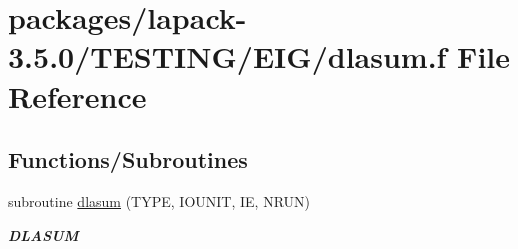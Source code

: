 \hypertarget{dlasum_8f}{}\section{packages/lapack-\/3.5.0/\+T\+E\+S\+T\+I\+N\+G/\+E\+I\+G/dlasum.f File Reference}
\label{dlasum_8f}
\subsection*{Functions/\+Subroutines}
\begin{DoxyCompactItemize}
\item 
subroutine \hyperlink{group__double__eig_ga3fd4cb18655d3b4b20912ad7f57c6890}{dlasum} (T\+Y\+P\+E, I\+O\+U\+N\+I\+T, I\+E, N\+R\+U\+N)
\begin{DoxyCompactList}\small\item\em {\bfseries D\+L\+A\+S\+U\+M} \end{DoxyCompactList}\end{DoxyCompactItemize}
